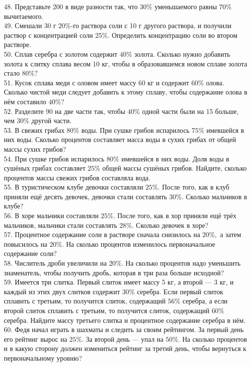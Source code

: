 \documentclass[12pt]{article}
\begin{document}
48. Представьте 200 в виде разности так, что $30\%$ уменьшаемого равны $70\%$ вычитаемого.\\
49. Смешали 30 г 20$\%$-го раствора соли с 10 г другого раствора, и получили раствор с концентрацией соли 25$\%$. Определить концентрацию соли во втором растворе.\\
50. Сплав серебра с золотом содержит $40\%$ золота. Сколько нужно добавить золота к слитку сплава весом 10 кг, чтобы в образовавшемся новом сплаве золота стало $80\%?$\\
51. Кусок сплава меди с оловом имеет массу 60 кг и содержит $60\%$ олова. Сколько чистой меди следует добавить к этому сплаву, чтобы содержание олова в нём составило $40\%?$\\
52. Разделите 90 на две части так, чтобы $40\%$ одной части были на 15 больше, чем $30\%$ другой части.\\
53. В свежих грибах $80\%$ воды. При сушке грибов испарилось $75\%$ имевшейся в них воды. Сколько процентов составляет масса воды в сухих грибах от общей массы сухих грибов?\\
54. При сушке грибов испарилось $80\%$ имевшейся в них воды. Доля воды в сушёных грибах составляет $25\%$ общей массы сушёных грибов. Найдите, сколько процентов массы свежих грибов составляла вода.\\
55. В туристическом клубе девочки составляли $25\%.$ После того, как в клуб приняли ещё десять девочек, девочки стали составлять $30\%.$ Сколько мальчиков в клубе?\\
56. В хоре мальчики составляли $25\%.$ После того, как в хор приняли ещё трёх мальчиков, мальчики стали составлять $28\%.$ Сколько девочек в хоре?\\
57. Процентное содержание соли в растворе сначала снизилось на $20\%,$ а затем повысилось на $20\%.$ На сколько процентов изменилось первоначальное содержание соли?\\
58. Числитель дроби увеличили на $20\%.$ На сколько процентов надо уменьшить знаменатель, чтобы получить дробь, которая в три раза больше исходной?\\
59. Имеется три слитка. Первый слиток имеет массу 5 кг, а второй --- 3 кг, и каждый из этих двух слитков содержит $30\%$ серебра. Если первый слиток сплавить с третьим, то получится слиток, содержащий $56\%$ серебра, а если второй слиток сплавить с третьим, то получится слиток, содержащий $60\%$ серебра. Найдите массу третьего слитка и процентное содержание серебра в нём.\\
60. Федя начал играть в шахматы и следить за своим рейтингом. За первый день его рейтинг вырос на $25\%.$ За второй день --- упал на $50\%.$ На сколько процентов и в какую сторону должен измениться рейтинг за третий день, чтобы вернуться к первоначальному уровню?\\
\end{document}

